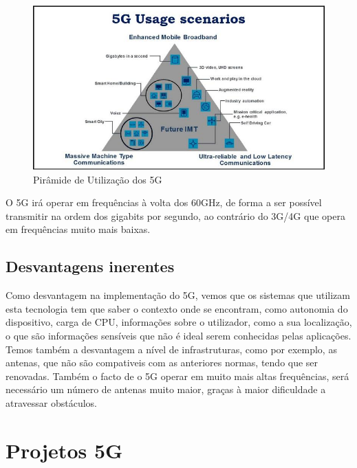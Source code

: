 \documentclass{llncs}
\begin{document}
\begin{figure}[h]
  \centering
  \includegraphics[width=12cm]{images/5Gpyramid.jpg}
  \caption{Pirâmide de Utilização dos 5G}
  \label{fig:pyramid}
\end{figure}

O 5G irá operar em frequências à volta dos 60GHz, de forma
a ser possível transmitir na ordem dos gigabits por segundo,
ao contrário do 3G/4G que opera em frequências muito mais baixas.

\subsection{Desvantagens inerentes}
Como desvantagem na implementação do 5G, vemos que os sistemas que
utilizam esta tecnologia tem que saber o contexto onde se encontram,
como autonomia do dispositivo, carga de CPU, informações sobre o 
utilizador, como a sua localização, o que são informações sensíveis
que não é ideal serem conhecidas pelas aplicações.\cite{Boyd12}
Temos também a desvantagem a nível de infrastruturas, como por exemplo,
as antenas, que não são compativeis com as anteriores normas, tendo
que ser renovadas. Também o facto de o 5G operar em muito mais altas
frequências, será necessário um número de antenas muito maior, graças à
maior dificuldade a atravessar obstáculos.

\section{Projetos 5G}
\end{document}
